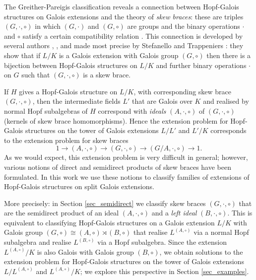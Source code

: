\documentclass[12pt,a4paper, reqno]{amsart}
\theoremstyle{definition}
\begin{document}
The Greither-Pareigis classification reveals a connection between Hopf-Galois structures on Galois extensions and the theory of \textit{skew braces}: these are triples $ (G,\cdot,\circ) $ in which $ (G,\cdot) $ and $ (G,\circ) $ are groups and the binary operations $ \cdot $ and $ \circ $ satisfy a certain compatibility relation \cite{GV17}. This connection is developed by several authors \cite{SV18}, \cite{Ch18}, \cite{Ch19b} and made most precise by Stefanello and Trappeniers \cite{ST23}: they show that if $ L/K $ is a Galois extension with Galois group $ (G,\circ) $ then there is a bijection between Hopf-Galois structures on $ L/K $ and further binary operations $ \cdot $ on $ G $ such that $ (G,\cdot,\circ) $ is a skew brace.

If $ H $ gives a Hopf-Galois structure on $ L/K $, with corresponding skew brace $ (G,\cdot,\circ) $, then the intermediate fields $ L' $ that are Galois over $ K $ and realised by normal Hopf subalgebras of $ H $ correspond with \textit{ideals} $ (A,\cdot,\circ) $ of $ (G,\cdot,\circ) $ (kernels of skew brace homomorphisms). Hence the extension problem for Hopf-Galois structures on the tower of Galois extensions $ L/L' $ and $ L'/K $ corresponds to the extension problem for skew braces
\begin{equation} \label{eqn_short_exact_sequence_SB}
1 \rightarrow (A,\cdot,\circ) \rightarrow (G,\cdot,\circ) \rightarrow (G/A,\cdot,\circ) \rightarrow 1. 
\end{equation}
As we would expect, this extension problem is very difficult in general; however,  various notions of direct and semidirect products of skew braces have been formulated. In this work we use these notions to classify families of extensions of Hopf-Galois structures on split Galois extensions. 

More precisely: in Section \ref{sec_semidirect} we classify skew braces $ (G,\cdot,\circ) $ that are the semidirect product of an ideal $ (A,\cdot,\circ) $ and a \textit{left ideal} $ (B,\cdot,\circ) $. This is equivalent to classifying Hopf-Galois structures on a Galois extension $ L/K $ with Galois group $ (G,\circ) \cong (A,\circ) \rtimes (B,\circ) $ that realise $ L^{(A,\circ)} $ via a normal Hopf subalgebra and realise $ L^{(B,\circ)} $ via a Hopf subalgebra. Since the extension $ L^{(A,\circ)}/K $ is also Galois with Galois group $ (B,\circ) $, we obtain solutions to the extension problem for Hopf-Galois structures on the tower of Galois extensions $ L/L^{(A,\circ)} $ and $ L^{(A,\circ)}/K $; we explore this perspective in Section \ref{sec_examples}. 
\end{document}
